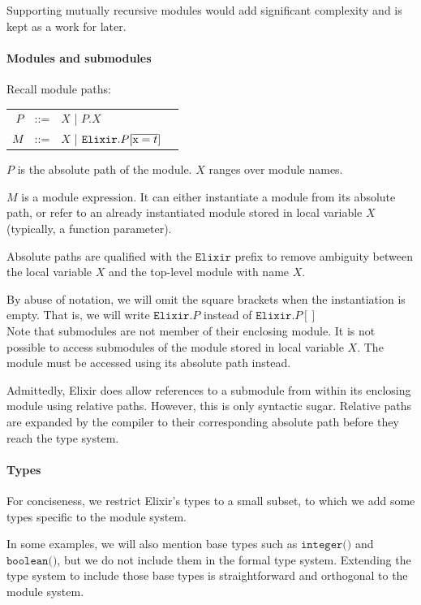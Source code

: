 \documentclass[12pt]{article}
\newcommand{\tx}{\text{\rm x}}
\newcommand{\Elixir}{\texttt{Elixir}}
\begin{document}
Supporting mutually recursive modules would add significant complexity and is kept as
a work for later.

\paragraph{Modules and submodules}

Recall module paths:

\begin{center}
    \begin{tabular}{rcll}
        $P$ & ::= & $X$ | $P.X$                           \\
        $M$ & ::= & $X$ | $\Elixir.P[\overline{\tx = t}]$
    \end{tabular}
\end{center}

$P$ is the absolute path of the module. $X$ ranges over module names.

$M$ is a module expression. It can either instantiate a module
from its absolute path, or refer to an already instantiated module stored
in local variable $X$ (typically, a function parameter).

Absolute paths are qualified with the $\Elixir$ prefix to remove ambiguity
between the local variable $X$ and the top-level module with name $X$.

By abuse of notation, we will omit the square brackets when
the instantiation is empty. That is, we will write $\Elixir.P$ instead
of $\Elixir.P[]$ \\

Note that submodules are not member of their enclosing module.
It is not possible to access submodules of the module stored in
local variable $X$. The module must be accessed using its absolute path instead.

Admittedly, Elixir does allow references to a submodule from within its enclosing
module using relative paths.
However, this is only syntactic sugar. Relative paths are expanded by the compiler to
their corresponding absolute path before they reach the type system.

\paragraph{Types}

For conciseness, we restrict Elixir's types to a small subset, to which
we add some types specific to the module system.

In some examples, we will also mention base types such as $\texttt{integer()}$ and $\texttt{boolean()}$,
but we do not include them in the formal type system. Extending the type system
to include those base types is straightforward and orthogonal to the module system.
\end{document}
